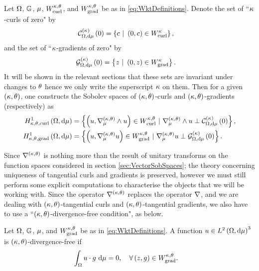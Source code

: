 \begin{definition} \label{def:ktSobSpaces}
	Let $\Omega$, $\mathbb{G}$, $\mu$, $W^{\kappa, \theta}_{\mathrm{curl}}$, and $W^{\kappa, \theta}_{\mathrm{grad}}$ be as in \eqref{eq:WktDefinitions}.
	Denote the set of ``$\kappa$-curls of zero" by
	\begin{align*}
		\kcurlZero{\ddom}{\ddmes} &= \clbracs{ c \ \vert \ \bracs{0,c}\in W^{\wavenumber}_{\mathrm{curl}}},
	\end{align*}
	and the set of ``$\kappa$-gradients of zero" by
	\begin{align*}
		\kgradZero{\ddom}{\ddmes} &= \clbracs{ z \ \vert \ \bracs{0,z}\in W^{\wavenumber}_{\mathrm{grad}}}.
	\end{align*}
	It will be shown in the relevant sections that these sets are invariant under changes to $\theta$ hence we only write the superscript $\kappa$ on them.
	Then for a given $\left( \kappa, \theta \right)$, one constructs the Sobolev spaces of $\left( \kappa, \theta \right)$-curls and $\left( \kappa, \theta \right)$-gradients (respectively) as
	\begin{align*}
		\ktcurlSob{\ddom}{\ddmes} &= \clbracs{ \bracs{u,\ktcurl{\ddmes}u}\in W^{\wavenumber, \qm}_{\mathrm{curl}} \ \vert \ \ktcurl{\ddmes}u \perp \kcurlZero{\ddom}{\ddmes} }, \\
		\ktgradSob{\ddom}{\ddmes} &= \clbracs{ \bracs{u,\ktgrad_{\ddmes}u}\in W^{\wavenumber, \qm}_{\mathrm{grad}} \ \vert \ \ktgrad_{\ddmes}u \perp \kgradZero{\ddom}{\ddmes} }.
	\end{align*}
\end{definition}
Since $\nabla^{\left( \kappa, \theta \right)}$ is nothing more than the result of unitary transforms on the function spaces considered in section \ref{sec:VectorSobSpaces}; the theory concerning uniqueness of tangential curls and gradients is preserved, however we must still perform some explicit computations to characterise the objects that we will be working with.
Since the operator $\nabla^{\left( \kappa, \theta \right)}$ replaces the operator $\nabla$, and we are dealing with $\left( \kappa, \theta \right)$-tangential curls and $\left( \kappa, \theta \right)$-tangential gradients, we also have to use a ``$\left( \kappa, \theta \right)$-divergence-free condition", as below.
\begin{definition} \label{def:ktDivFreeCond}
	Let $\Omega$, $\mathbb{G}$, $\mu$, and $W^{\kappa, \theta}_{\mathrm{grad}}$ be as in \eqref{eq:WktDefinitions}.
	A function $u\in L^{2}\left( \Omega,\mathrm{d}\mu \right)^3$ is $\left( \kappa, \theta \right)$-divergence-free if
	\begin{align*}
		\int_{\Omega} u\cdot g  \ \mathrm{d}\mu &= 0, \quad \forall \left( z,g \right)\in W^{\kappa, \theta}_{\mathrm{grad}}.
	\end{align*}
\end{definition}
